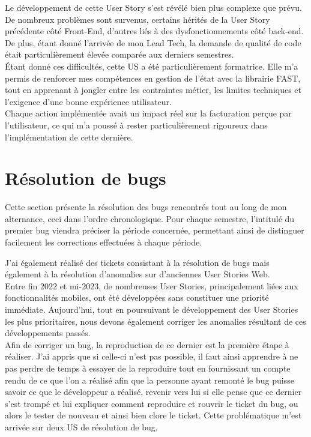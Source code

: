 \documentclass{article}
\begin{document}
Le développement de cette User Story s'est révélé bien plus complexe que prévu. De nombreux problèmes sont survenus, certains hérités de la User Story précédente côté Front-End, d'autres liés à des dysfonctionnements côté back-end. \\

De plus, étant donné l'arrivée de mon Lead Tech, la demande de qualité de code était particulièrement élevée comparée aux derniers semestres. \\

Étant donné ces difficultés, cette US a été particulièrement formatrice. Elle m'a permis de renforcer mes compétences en gestion de l'état avec la librairie FAST, tout en apprenant à jongler entre les contraintes métier, les limites techniques et l'exigence d'une bonne expérience utilisateur. \\

Chaque action implémentée avait un impact réel sur la facturation perçue par l'utilisateur, ce qui m'a poussé à rester particulièrement rigoureux dans l'implémentation de cette dernière.

\newpage

\section{Résolution de bugs}

Cette section présente la résolution des bugs rencontrés tout au long de mon alternance, ceci dans l'ordre chronologique. Pour chaque semestre, l’intitulé du premier bug viendra préciser la période concernée, permettant ainsi de distinguer facilement les corrections effectuées à chaque période.

J'ai également réalisé des tickets consistant à la résolution de bugs mais également à la résolution d'anomalies sur d'anciennes User Stories Web. \\

Entre fin 2022 et mi-2023, de nombreuses User Stories, principalement liées aux fonctionnalités mobiles, ont été développées sans constituer une priorité immédiate. Aujourd'hui, tout en poursuivant le développement des User Stories les plus prioritaires, nous devons également corriger les anomalies résultant de ces développements passés. \\

Afin de corriger un bug, la reproduction de ce dernier est la première étape à réaliser. J'ai appris que si celle-ci n'est pas possible, il faut ainsi apprendre à ne pas perdre de temps à essayer de la reproduire tout en fournissant un compte rendu de ce que l'on a réalisé afin que la personne ayant remonté le bug puisse savoir ce que le développeur a réalisé, revenir vers lui si elle pense que ce dernier s'est trompé et lui expliquer comment reproduire et rouvrir le ticket du bug, ou alors le tester de nouveau et ainsi bien clore le ticket. Cette problématique m'est arrivée sur deux US de résolution de bug.
\end{document}
